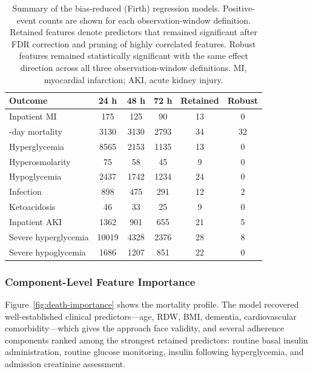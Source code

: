 \begin{table}[t]
\centering
\caption{Summary of the bias-reduced (Firth) regression models.
Positive-event counts are shown for each observation-window definition.
Retained features denote predictors that remained significant after FDR
correction and pruning of highly correlated features. Robust features
remained statistically significant with the same effect direction across
all three observation-window definitions. MI, myocardial infarction;
AKI, acute kidney injury.}
\label{tab:firth-summary}

\begin{tabularx}{\textwidth}{
>{\raggedright\arraybackslash}X
ccccc
}
\toprule
Outcome & 24 h & 48 h & 72 h &
Retained & Robust \\
\midrule

Inpatient MI & 175 & 125 & 90 & 13 & 0 \\
30-day mortality & 3130 & 3130 & 2793 & 34 & 32 \\
Hyperglycemia & 8565 & 2153 & 1135 & 13 & 0 \\
Hyperosmolarity & 75 & 58 & 45 & 9 & 0 \\
Hypoglycemia & 2437 & 1742 & 1234 & 24 & 0 \\
Infection & 898 & 475 & 291 & 12 & 2 \\
Ketoacidosis & 46 & 33 & 25 & 9 & 0 \\
Inpatient AKI & 1362 & 901 & 655 & 21 & 5 \\
Severe hyperglycemia & 10019 & 4328 & 2376 & 28 & 8 \\
Severe hypoglycemia & 1686 & 1207 & 851 & 22 & 0 \\

\bottomrule
\end{tabularx}
\end{table}

\subsubsection{Component-Level Feature Importance}

Figure~\ref{fig:death-importance} shows the mortality profile. The model
recovered well-established clinical predictors---age, RDW, BMI, dementia,
cardiovascular comorbidity---which gives the approach face validity, and
several adherence components ranked among the strongest retained predictors:
routine basal insulin administration, routine glucose monitoring, insulin
following hyperglycemia, and admission creatinine assessment.

